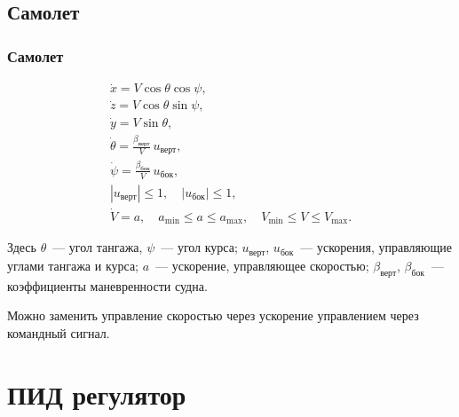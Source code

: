 \documentclass[10pt,t]{beamer}
\begin{document}
\subsection[Самолет]{Самолет}
\begin{frame}
\frametitle{Самолет}
\small

\begin{equation*}
  \begin{array}{l}
    \dot x = V \cos \theta \cos \psi, \\[0.75ex]
    \dot z = V \cos \theta \sin \psi, \\[0.75ex]
    \dot y = V \sin \theta, \\[0.75ex]
    \dot \theta = \frac{\beta_\text{верт}}{V} \, u_\text{верт}, \\[0.75ex]
    \dot \psi   = \frac{\beta_\text{бок}}{V} \, u_\text{бок}, \\[0.75ex]
    |u_\text{верт}| \leqslant 1, 
      \quad |u_\text{бок}| \leqslant 1, \\[0.75ex]
    \dot V = a, \quad  
      a_{\min} \leqslant a \leqslant a_{\max},
      \quad V_{\min} \leqslant V \leqslant V_{\max}.
  \end{array}
\end{equation*}

Здесь $\theta$~--- угол тангажа, $\psi$~--- угол курса; $u_\text{верт}$, $u_\text{бок}$~--- ускорения, управляющие углами тангажа и курса; $a$~--- ускорение, управляющее скоростью; $\beta_\text{верт}$, $\beta_\text{бок}$~--- коэффициенты маневренности судна. 

Можно заменить управление скоростью через ускорение управлением через командный сигнал.

\end{frame}
\section[ПИД регулятор]{ПИД регулятор}
\end{document}

